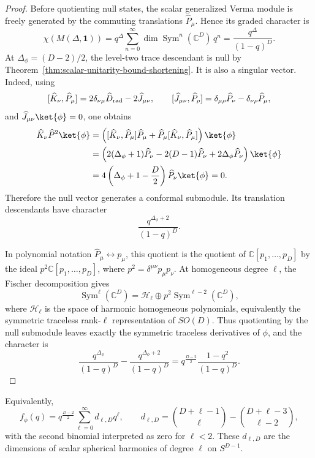 \begin{proof}
Before quotienting null states, the scalar generalized Verma module is freely
generated by the commuting translations \(\widehat P_\mu\).  Hence its graded
character is
\[
  \chi(M(\Delta,\mathbf 1))
  =
  q^\Delta\sum_{n=0}^{\infty}
  \dim\operatorname{Sym}^n(\mathbb C^D)\,q^n
  =
  \frac{q^\Delta}{(1-q)^D}.
\]
At \(\Delta_\phi=(D-2)/2\), the level-two trace descendant is null by
Theorem~\ref{thm:scalar-unitarity-bound-shortening}.  It is also a singular
vector.  Indeed, using
\[
  [\widehat K_\nu,\widehat P_\mu]
  =
  2\delta_{\nu\mu}\widehat D_{\rm rad}
  -2\widehat J_{\mu\nu},
  \qquad
  [\widehat J_{\mu\nu},\widehat P_\rho]
  =
  \delta_{\mu\rho}\widehat P_\nu-\delta_{\nu\rho}\widehat P_\mu,
\]
and \(\widehat J_{\mu\nu}\ket{\phi}=0\), one obtains
\begin{align*}
  \widehat K_\nu \widehat P^2\ket{\phi}
  &=
  \left(
    [\widehat K_\nu,\widehat P_\mu]\widehat P_\mu
    +
    \widehat P_\mu[\widehat K_\nu,\widehat P_\mu]
  \right)\ket{\phi}
  \\
  &=
  \left(
    2(\Delta_\phi+1)\widehat P_\nu
    -2(D-1)\widehat P_\nu
    +2\Delta_\phi \widehat P_\nu
  \right)\ket{\phi}
  \\
  &=
  4\left(\Delta_\phi+1-\frac D2\right)\widehat P_\nu\ket{\phi}
  =
  0 .
\end{align*}
Therefore the null vector generates a conformal submodule.  Its translation
descendants have character
\[
  \frac{q^{\Delta_\phi+2}}{(1-q)^D}.
\]

In polynomial notation \(\widehat P_\mu\leftrightarrow p_\mu\), this quotient
is the quotient of \(\mathbb C[p_1,\ldots,p_D]\) by the ideal
\(p^2\mathbb C[p_1,\ldots,p_D]\), where
\(p^2=\delta^{\mu\nu}p_\mu p_\nu\).  At homogeneous degree \(\ell\), the
Fischer decomposition gives
\[
  \operatorname{Sym}^\ell(\mathbb C^D)
  =
  \mathcal H_\ell
  \oplus
  p^2\operatorname{Sym}^{\ell-2}(\mathbb C^D),
\]
where \(\mathcal H_\ell\) is the space of harmonic homogeneous polynomials,
equivalently the symmetric traceless rank-\(\ell\) representation of
\(SO(D)\).  Thus quotienting by the null submodule leaves exactly the
symmetric traceless derivatives of \(\phi\), and the character is
\[
  \frac{q^{\Delta_\phi}}{(1-q)^D}
  -
  \frac{q^{\Delta_\phi+2}}{(1-q)^D}
  =
  q^{\frac{D-2}{2}}\frac{1-q^2}{(1-q)^D}.
\]
\end{proof}

Equivalently,
\[
  f_\phi(q)
  =
  q^{\frac{D-2}{2}}
  \sum_{\ell=0}^\infty d_{\ell,D}q^\ell,
  \qquad
  d_{\ell,D}
  =
  \binom{D+\ell-1}{\ell}
  -
  \binom{D+\ell-3}{\ell-2},
\]
with the second binomial interpreted as zero for \(\ell<2\).  These
\(d_{\ell,D}\) are the dimensions of scalar spherical harmonics of degree
\(\ell\) on \(S^{D-1}\).

